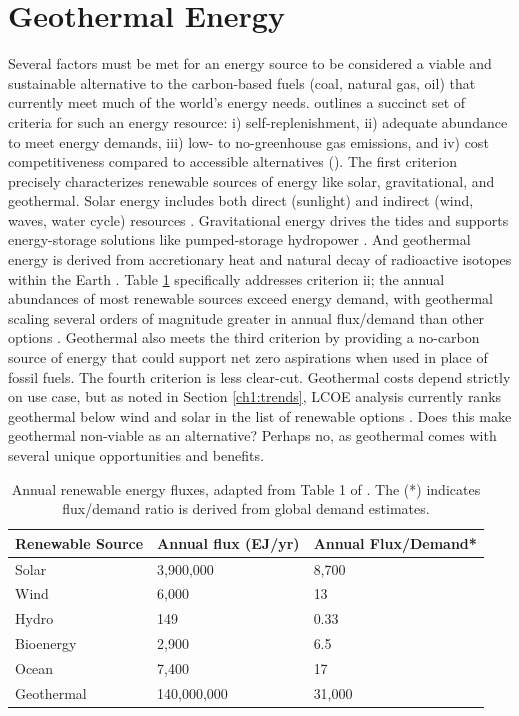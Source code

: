 \section{Geothermal Energy}\label{ch1:geothermal}
Several factors must be met for an energy source to be considered a viable and sustainable alternative to the carbon-based fuels (coal, natural gas, oil) that currently meet much of the world’s energy needs. \citeauthor{glassley_geothermal_2015} outlines a succinct set of criteria for such an energy resource: i) self-replenishment, ii) adequate abundance to meet energy demands, iii) low- to no-greenhouse gas emissions, and iv) cost competitiveness compared to accessible alternatives (\citeyear[p.\ 7]{glassley_geothermal_2015}). The first criterion precisely characterizes renewable sources of energy like solar, gravitational, and geothermal. Solar energy includes both direct (sunlight) and indirect (wind, waves, water cycle) resources \citep{hohmeyer_ipcc_2008}. Gravitational energy drives the tides and supports energy-storage solutions like pumped-storage hydropower \citep{eere_pumped-storage_2021,hohmeyer_ipcc_2008}. And geothermal energy is derived from accretionary heat and natural decay of radioactive isotopes within the Earth \citep{hohmeyer_ipcc_2008}. Table \ref{tab:renewableflux} specifically addresses criterion ii; the annual abundances of most renewable sources exceed energy demand, with geothermal scaling several orders of magnitude greater in annual flux/demand than other options \citep{hohmeyer_ipcc_2008}. Geothermal also meets the third criterion by providing a no-carbon source of energy that could support net zero aspirations when used in place of fossil fuels. The fourth criterion is less clear-cut. Geothermal costs depend strictly on use case, but as noted in Section \ref{ch1:trends}, LCOE analysis currently ranks geothermal below wind and solar in the list of renewable options \citep{lazard_lazards_2020}. Does this make geothermal non-viable as an alternative? Perhaps no, as geothermal comes with several unique opportunities and benefits.

\begin{table}[h!]
\centering
\begin{tabular}{|l|l|l|}
\hline
\textbf{Renewable Source} & \textbf{Annual flux (EJ/yr)} & \textbf{Annual Flux/Demand*} \\ \hline
Solar      & 3,900,000   & 8,700  \\ \hline
Wind       & 6,000       & 13     \\ \hline
Hydro      & 149         & 0.33   \\ \hline
Bioenergy  & 2,900       & 6.5    \\ \hline
Ocean      & 7,400       & 17     \\ \hline
Geothermal & 140,000,000 & 31,000 \\ \hline
\end{tabular}
\caption[Annual renewable energy fluxes]{Annual renewable energy fluxes, adapted from Table 1 of \protect\citep{hohmeyer_ipcc_2008}. The (*) indicates flux/demand ratio is derived from global demand estimates.}
\label{tab:renewableflux}
\end{table}

